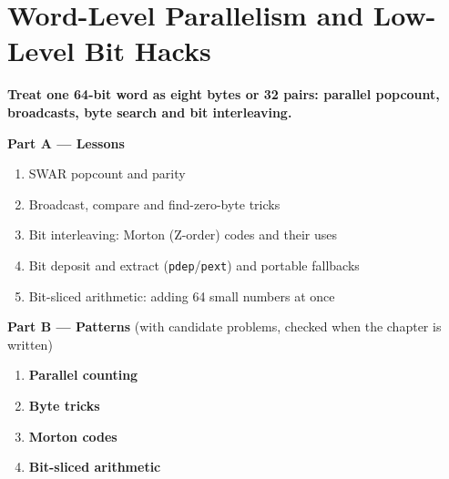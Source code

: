 \chapter{Word-Level Parallelism and Low-Level Bit Hacks}
\label{ch:swar}

\begin{tcolorbox}[enhanced, colback=white, colframe=secondaryblue, boxrule=1pt, arc=2mm]
\textbf{\large\textcolor{primaryblue}{Treat one 64-bit word as eight bytes or 32 pairs: parallel popcount, broadcasts, byte search and bit interleaving.}}
\end{tcolorbox}


\begin{plannedbox}
\textbf{Part A --- Lessons}
\begin{enumerate}[leftmargin=*, label=\textbf{A\arabic*.}, itemsep=1pt]
    \item SWAR popcount and parity
    \item Broadcast, compare and find-zero-byte tricks
    \item Bit interleaving: Morton (Z-order) codes and their uses
    \item Bit deposit and extract (\texttt{pdep}/\texttt{pext}) and portable fallbacks
    \item Bit-sliced arithmetic: adding 64 small numbers at once
\end{enumerate}
\textbf{Part B --- Patterns} (with candidate problems, checked when the chapter is written)
\begin{enumerate}[leftmargin=*, label=\textbf{P\arabic*.}, itemsep=1pt]
    \item \textbf{Parallel counting}
    \item \textbf{Byte tricks}
    \item \textbf{Morton codes}
    \item \textbf{Bit-sliced arithmetic}
\end{enumerate}
\end{plannedbox}
